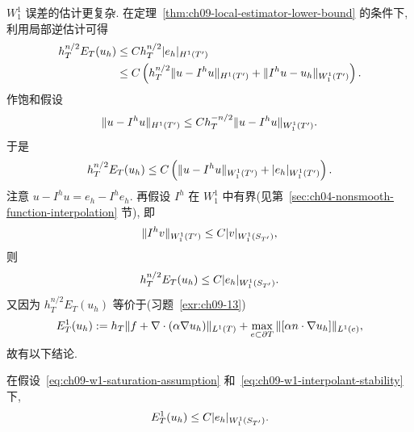 $W_1^1$ 误差的估计更复杂. 在定理~\ref{thm:ch09-local-estimator-lower-bound} 的条件下, 利用局部逆估计可得
\begin{align*}
\MathBookFormulaID{formula-ch09-w1-local-estimator-prebound}
h_T^{n/2}E_T(u_h)
&\leq Ch_T^{n/2}|e_h|_{H^1(T')}\\
&\leq C\left(h_T^{n/2}\|u-I^hu\|_{H^1(T')}
+\|I^hu-u_h\|_{W_1^1(T')}\right).
\end{align*}
作饱和假设
\begin{equation}
\MathBookFormulaID{formula-ch09-w1-saturation-assumption}
\label{eq:ch09-w1-saturation-assumption}
\|u-I^hu\|_{H^1(T')}\leq Ch_T^{-n/2}\|u-I^hu\|_{W_1^1(T')}.
\end{equation}
于是
\[
\MathBookFormulaID{formula-ch09-w1-estimator-with-interpolant}
h_T^{n/2}E_T(u_h)
\leq C\left(\|u-I^hu\|_{W_1^1(T')}+|e_h|_{W_1^1(T')}\right).
\]
注意 $u-I^hu=e_h-I^he_h$. 再假设 $I^h$ 在 $W_1^1$ 中有界(见第~\ref{sec:ch04-nonsmooth-function-interpolation} 节), 即
\begin{equation}
\MathBookFormulaID{formula-ch09-w1-interpolant-stability}
\label{eq:ch09-w1-interpolant-stability}
\|I^hv\|_{W_1^1(T')}\leq C|v|_{W_1^1(S_{T'})},
\end{equation}
则
\begin{equation}
\MathBookFormulaID{formula-ch09-w1-scaled-estimator}
\label{eq:ch09-w1-scaled-estimator}
h_T^{n/2}E_T(u_h)\leq C|e_h|_{W_1^1(S_{T'})}.
\end{equation}
又因为 $h_T^{n/2}E_T(u_h)$ 等价于(习题~\ref{exr:ch09-13})
\begin{equation}
\MathBookFormulaID{formula-ch09-l1-error-indicator}
\label{eq:ch09-l1-error-indicator}
E_T^1(u_h):=h_T\|f+\nabla\cdot(\alpha\nabla u_h)\|_{L^1(T)}
+\max_{e\subset\partial T}\|[\alpha n\cdot\nabla u_h]\|_{L^1(e)},
\end{equation}
故有以下结论.

\begin{Theorem}
\label{thm:ch09-local-l1-estimator}
在假设~\eqref{eq:ch09-w1-saturation-assumption} 和~\eqref{eq:ch09-w1-interpolant-stability} 下,
\[
\MathBookFormulaID{formula-ch09-local-l1-estimator}
E_T^1(u_h)\leq C|e_h|_{W_1^1(S_{T'})}.
\]
\end{Theorem}
